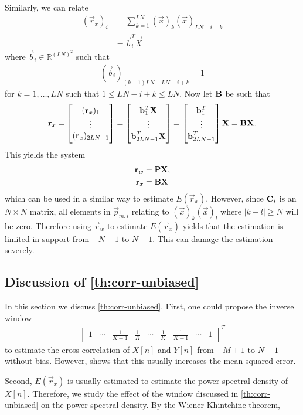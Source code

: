 \documentclass[a4paper, openany, oneside]{memoir}
\begin{document}
Similarly, we can relate
\begin{align*}
    (\vec{r}_x)_i &= \sum_{k=1}^{LN}(\vec{x})_k (\vec{x})_{LN-i+k} \\
    &= \vec{b}_i^T \vec{X}
\end{align*}
where $\vec{b}_i \in \mathbb{R}^{(LN)^2}$ such that
\begin{align*}
    (\vec{b}_i)_{(k-1)LN+LN-i+k} = 1
\end{align*}
for $k = 1,\ldots,LN$ such that $1 \le LN-i+k \le LN$. Now let $\boldsymbol{\mathbf{B}}$ be such that
\begin{align*}
    \boldsymbol{\mathbf{r}}_x = \begin{bmatrix}
        (\boldsymbol{\mathbf{r}}_x)_1 \\
        \vdots \\
        (\boldsymbol{\mathbf{r}}_x)_{2LN-1}
    \end{bmatrix} = \begin{bmatrix}
        \boldsymbol{\mathbf{b}}_1^T \boldsymbol{\mathbf{X}} \\
        \vdots \\
        \boldsymbol{\mathbf{b}}_{2LN-1}^T \boldsymbol{\mathbf{X}}
    \end{bmatrix} = \begin{bmatrix}
        \boldsymbol{\mathbf{b}}_1^T \\
        \vdots \\
        \boldsymbol{\mathbf{b}}_{2LN-1}^T
    \end{bmatrix} \boldsymbol{\mathbf{X}} = \boldsymbol{\mathbf{B}} \boldsymbol{\mathbf{X}}.
\end{align*}
This yields the system
\begin{align*}
    \boldsymbol{\mathbf{r}}_w &= \boldsymbol{\mathbf{P}} \boldsymbol{\mathbf{X}}, \\
    \boldsymbol{\mathbf{r}}_x &= \boldsymbol{\mathbf{B}} \boldsymbol{\mathbf{X}}
\end{align*}
which can be used in a similar way to estimate $E(\vec{r}_x)$. However, since $\boldsymbol{\mathbf{C}}_i$ is an $N \times N$ matrix, all elements in $\vec{p}_{m,i}$ relating to $(\vec{x})_k (\vec{x})_l$ where $|k - l| \ge N$ will be zero. Therefore using $\vec{r}_w$ to estimate $E(\vec{r}_x)$ yields that the estimation is limited in support from $-N+1$ to $N-1$. This can damage the estimation severely.

\subsection{Discussion of \cref{th:corr-unbiased}}
In this section we discuss \cref{th:corr-unbiased}. First, one could propose the inverse window
\begin{align*}
    \begin{bmatrix}
        1 & \cdots & \frac{1}{K-1} & \frac{1}{K} & \cdots & \frac{1}{K} & \frac{1}{K-1} & \cdots & 1
    \end{bmatrix}^T
\end{align*}
to estimate the cross-correlation of $X[n]$ and $Y[n]$ from $-M+1$ to $N-1$ without bias. However, \cite{percival1993univariate} shows that this usually increases the mean squared error.

Second, $E(\vec{r}_x)$ is usually estimated to estimate the power spectral density of $X[n]$. Therefore, we study the effect of the window discussed in \cref{th:corr-unbiased} on the power spectral density. By the Wiener-Khintchine theorem, 

\backmatter
{}
\printbibliography
\end{document}
